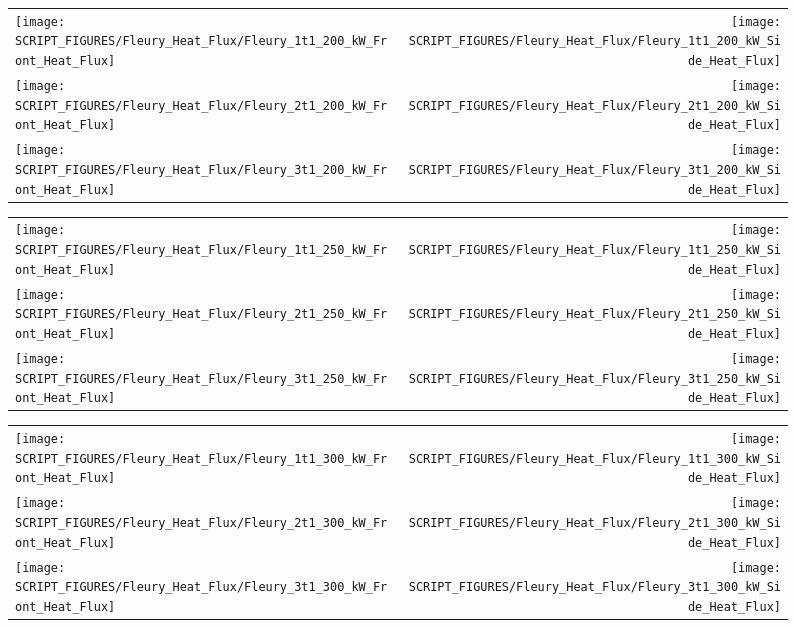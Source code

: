 \begin{figure}[!ht]
\begin{tabular*}{\textwidth}{l@{\extracolsep{\fill}}r}
\texttt{[image: SCRIPT\_FIGURES/Fleury\_Heat\_Flux/Fleury\_1t1\_200\_kW\_Front\_Heat\_Flux]} &
\texttt{[image: SCRIPT\_FIGURES/Fleury\_Heat\_Flux/Fleury\_1t1\_200\_kW\_Side\_Heat\_Flux]} \\
\texttt{[image: SCRIPT\_FIGURES/Fleury\_Heat\_Flux/Fleury\_2t1\_200\_kW\_Front\_Heat\_Flux]} &
\texttt{[image: SCRIPT\_FIGURES/Fleury\_Heat\_Flux/Fleury\_2t1\_200\_kW\_Side\_Heat\_Flux]} \\
\texttt{[image: SCRIPT\_FIGURES/Fleury\_Heat\_Flux/Fleury\_3t1\_200\_kW\_Front\_Heat\_Flux]} &
\texttt{[image: SCRIPT\_FIGURES/Fleury\_Heat\_Flux/Fleury\_3t1\_200\_kW\_Side\_Heat\_Flux]}
\end{tabular*}
\label{Fleury_Heat_Flux_200_kW}
\end{figure}

\begin{figure}[!ht]
\begin{tabular*}{\textwidth}{l@{\extracolsep{\fill}}r}
\texttt{[image: SCRIPT\_FIGURES/Fleury\_Heat\_Flux/Fleury\_1t1\_250\_kW\_Front\_Heat\_Flux]} &
\texttt{[image: SCRIPT\_FIGURES/Fleury\_Heat\_Flux/Fleury\_1t1\_250\_kW\_Side\_Heat\_Flux]} \\
\texttt{[image: SCRIPT\_FIGURES/Fleury\_Heat\_Flux/Fleury\_2t1\_250\_kW\_Front\_Heat\_Flux]} &
\texttt{[image: SCRIPT\_FIGURES/Fleury\_Heat\_Flux/Fleury\_2t1\_250\_kW\_Side\_Heat\_Flux]} \\
\texttt{[image: SCRIPT\_FIGURES/Fleury\_Heat\_Flux/Fleury\_3t1\_250\_kW\_Front\_Heat\_Flux]} &
\texttt{[image: SCRIPT\_FIGURES/Fleury\_Heat\_Flux/Fleury\_3t1\_250\_kW\_Side\_Heat\_Flux]}
\end{tabular*}
\label{Fleury_Heat_Flux_250_kW}
\end{figure}

\begin{figure}[!ht]
\begin{tabular*}{\textwidth}{l@{\extracolsep{\fill}}r}
\texttt{[image: SCRIPT\_FIGURES/Fleury\_Heat\_Flux/Fleury\_1t1\_300\_kW\_Front\_Heat\_Flux]} &
\texttt{[image: SCRIPT\_FIGURES/Fleury\_Heat\_Flux/Fleury\_1t1\_300\_kW\_Side\_Heat\_Flux]} \\
\texttt{[image: SCRIPT\_FIGURES/Fleury\_Heat\_Flux/Fleury\_2t1\_300\_kW\_Front\_Heat\_Flux]} &
\texttt{[image: SCRIPT\_FIGURES/Fleury\_Heat\_Flux/Fleury\_2t1\_300\_kW\_Side\_Heat\_Flux]} \\
\texttt{[image: SCRIPT\_FIGURES/Fleury\_Heat\_Flux/Fleury\_3t1\_300\_kW\_Front\_Heat\_Flux]} &
\texttt{[image: SCRIPT\_FIGURES/Fleury\_Heat\_Flux/Fleury\_3t1\_300\_kW\_Side\_Heat\_Flux]}
\end{tabular*}
\label{Fleury_Heat_Flux_300_kW}
\end{figure}

